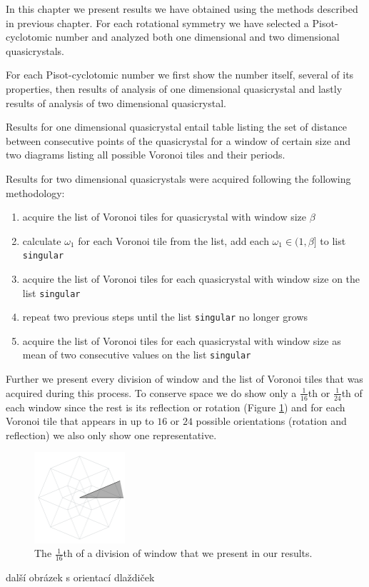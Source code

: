 \documentclass[text.tex]{subfiles}
\begin{document}
In this chapter we present results we have obtained using the methods described in previous chapter. For each rotational symmetry we have selected a Pisot-cyclotomic number and analyzed both one dimensional and two dimensional quasicrystals. 

For each Pisot-cyclotomic number we first show the number itself, several of its properties, then results of analysis of one dimensional quasicrystal and lastly results of analysis of two dimensional quasicrystal. 

Results for one dimensional quasicrystal entail table listing the set of distance between consecutive points of the quasicrystal for a window of certain size and two diagrams listing all possible Voronoi tiles and their periods. 

Results for two dimensional quasicrystals were acquired following the following methodology:
\begin{enumerate}
\item acquire the list of Voronoi tiles for quasicrystal with window size $\beta$
\item calculate $\omega_1$ for each Voronoi tile from the list, add each $\omega_1\in(1,\beta]$ to list \texttt{singular}
\item acquire the list of Voronoi tiles for each quasicrystal with window size on the list \texttt{singular}
\item repeat two previous steps until the list \texttt{singular} no longer grows
\item acquire the list of Voronoi tiles for each quasicrystal with window size as mean of two consecutive values on the list \texttt{singular}
\end{enumerate}

Further we present every division of window and the list of Voronoi tiles that was acquired during this process. To conserve space we do show only a $\frac{1}{16}$th or $\frac{1}{24}$th of each window since the rest is its reflection or rotation (Figure \ref{fig_results_section}) and for each Voronoi tile that appears in up to $16$ or $24$ possible orientations (rotation and reflection) we also only show one representative. 

\begin{figure}[h!]
\centering
\includegraphics[width=0.3\textwidth]{img/results/section}
\caption{The $\frac{1}{16}$th of a division of window that we present in our results. }
\label{fig_results_section}
\end{figure}

{\huge další obrázek s orientací dlaždiček}
\end{document}
